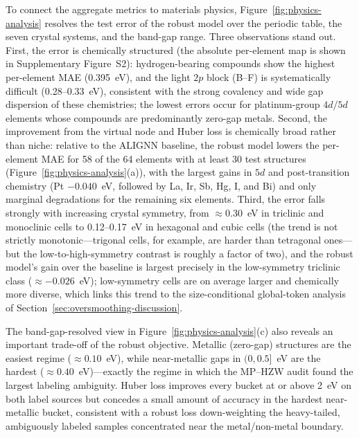 \documentclass[a4paper,11pt]{article}
\begin{document}
To connect the aggregate metrics to materials physics, Figure~\ref{fig:physics-analysis} resolves the test error of the robust model over the periodic table, the seven crystal systems, and the band-gap range. Three observations stand out. First, the error is chemically structured (the absolute per-element map is shown in Supplementary Figure~S2): hydrogen-bearing compounds show the highest per-element MAE (0.395~eV), and the light \(2p\) block (B--F) is systematically difficult (0.28--0.33~eV), consistent with the strong covalency and wide gap dispersion of these chemistries; the lowest errors occur for platinum-group \(4d/5d\) elements whose compounds are predominantly zero-gap metals. Second, the improvement from the virtual node and Huber loss is chemically broad rather than niche: relative to the ALIGNN baseline, the robust model lowers the per-element MAE for 58 of the 64 elements with at least 30 test structures (Figure~\ref{fig:physics-analysis}(a)), with the largest gains in \(5d\) and post-transition chemistry (Pt \(-0.040\)~eV, followed by La, Ir, Sb, Hg, I, and Bi) and only marginal degradations for the remaining six elements. Third, the error falls strongly with increasing crystal symmetry, from \(\approx0.30\)~eV in triclinic and monoclinic cells to 0.12--0.17~eV in hexagonal and cubic cells (the trend is not strictly monotonic---trigonal cells, for example, are harder than tetragonal ones---but the low-to-high-symmetry contrast is roughly a factor of two), and the robust model's gain over the baseline is largest precisely in the low-symmetry triclinic class (\(\approx-0.026\)~eV); low-symmetry cells are on average larger and chemically more diverse, which links this trend to the size-conditional global-token analysis of Section~\ref{sec:oversmoothing-discussion}.

The band-gap-resolved view in Figure~\ref{fig:physics-analysis}(c) also reveals an important trade-off of the robust objective. Metallic (zero-gap) structures are the easiest regime (\(\approx0.10\)~eV), while near-metallic gaps in \((0,0.5]\)~eV are the hardest (\(\approx0.40\)~eV)---exactly the regime in which the MP--HZW audit found the largest labeling ambiguity. Huber loss improves every bucket at or above 2~eV on both label sources but concedes a small amount of accuracy in the hardest near-metallic bucket, consistent with a robust loss down-weighting the heavy-tailed, ambiguously labeled samples concentrated near the metal/non-metal boundary.
\end{document}
